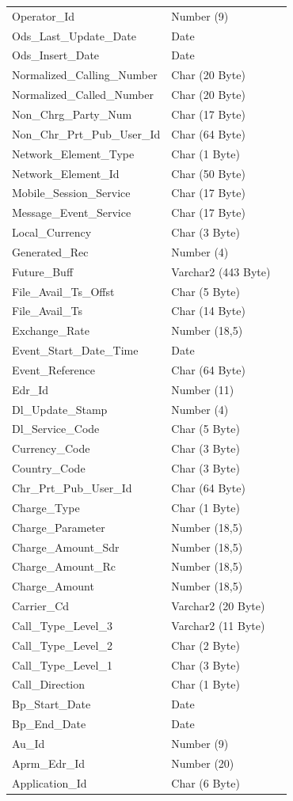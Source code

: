 \documentclass[12pt,twoside]{article}
\begin{document}
\begin{longtable}{l|l|l}
Operator\_Id & Number (9) & \\
Ods\_Last\_Update\_Date & Date & \\
Ods\_Insert\_Date & Date & \\
Normalized\_Calling\_Number & Char (20 Byte) & \\
Normalized\_Called\_Number & Char (20 Byte) & \\
Non\_Chrg\_Party\_Num & Char (17 Byte) & \\
Non\_Chr\_Prt\_Pub\_User\_Id & Char (64 Byte) & \\
Network\_Element\_Type & Char (1 Byte) & \\
Network\_Element\_Id & Char (50 Byte) & \\
Mobile\_Session\_Service & Char (17 Byte) & \\
Message\_Event\_Service & Char (17 Byte) & \\
Local\_Currency & Char (3 Byte) & \\
Generated\_Rec & Number (4) & \\
Future\_Buff & Varchar2 (443 Byte) & \\
File\_Avail\_Ts\_Offst & Char (5 Byte) & \\
File\_Avail\_Ts & Char (14 Byte) & \\
Exchange\_Rate & Number (18,5) & \\
Event\_Start\_Date\_Time & Date & \\
Event\_Reference & Char (64 Byte) & \\
Edr\_Id & Number (11) & \\
Dl\_Update\_Stamp & Number (4) & \\
Dl\_Service\_Code & Char (5 Byte) & \\
Currency\_Code & Char (3 Byte) & \\
Country\_Code & Char (3 Byte) & \\
Chr\_Prt\_Pub\_User\_Id & Char (64 Byte) & \\
Charge\_Type & Char (1 Byte) & \\
Charge\_Parameter & Number (18,5) & \\
Charge\_Amount\_Sdr & Number (18,5) & \\
Charge\_Amount\_Rc & Number (18,5) & \\
Charge\_Amount & Number (18,5) & \\
Carrier\_Cd & Varchar2 (20 Byte) & \\
Call\_Type\_Level\_3 & Varchar2 (11 Byte) & \\
Call\_Type\_Level\_2 & Char (2 Byte) & \\
Call\_Type\_Level\_1 & Char (3 Byte) & \\
Call\_Direction & Char (1 Byte) & \\
Bp\_Start\_Date & Date & \\
Bp\_End\_Date & Date & \\
Au\_Id & Number (9) & \\
Aprm\_Edr\_Id & Number (20) & \\
Application\_Id & Char (6 Byte) & \\
\hline
\end{longtable}
\normalsize
\end{document}
